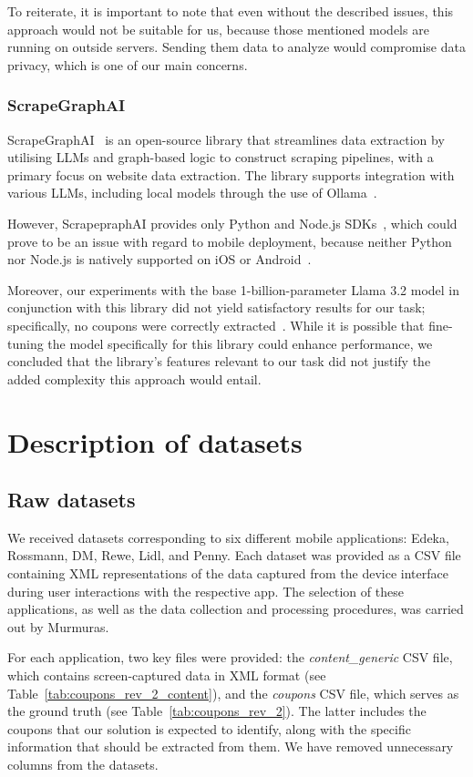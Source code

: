 \documentclass[licencjacka,en]{pracamgr}
\begin{document}
To reiterate, it is important to note that even without the described issues, this approach would not be suitable for us, because those mentioned models are running on outside servers. Sending them data to analyze would compromise data privacy, which is one of our main concerns.

\subsection{ScrapeGraphAI}
ScrapeGraphAI~\cite{scapegraph_repo} is an open-source library that streamlines data extraction by utilising LLMs and graph-based logic to construct scraping pipelines, with a primary focus on website data extraction. The library supports integration with various LLMs, including local models through the use of Ollama~\cite{ollama_repo, scapegraph_usage}.

However, ScrapepraphAI provides only Python and Node.js SDKs~\cite{scapegraph_sdks}, which could prove to be an issue with regard to mobile deployment, because neither Python nor Node.js is natively supported on iOS or Android~\cite{android_dev_site, ios_dev_site}.

Moreover, our experiments with the base 1-billion-parameter Llama 3.2 model in conjunction with this library did not yield satisfactory results for our task; specifically, no coupons were correctly extracted~\cite{scrapegraph-exp}. While it is possible that fine-tuning the model specifically for this library could enhance performance, we concluded that the library's features relevant to our task did not justify the added complexity this approach would entail.

\chapter{Description of datasets} \label{chap:datasets}
\section{Raw datasets}
We received datasets corresponding to six different mobile applications: Edeka, Rossmann, DM, Rewe, Lidl, and Penny. Each dataset was provided as a CSV file containing XML representations of the data captured from the device interface during user interactions with the respective app. The selection of these applications, as well as the data collection and processing procedures, was carried out by Murmuras.

For each application, two key files were provided: the \textit{content\_generic} CSV file, which contains screen-captured data in XML format (see Table~\ref{tab:coupons_rev_2_content}), and the \textit{coupons} CSV file, which serves as the ground truth (see Table~\ref{tab:coupons_rev_2}). The latter includes the coupons that our solution is expected to identify, along with the specific information that should be extracted from them. We have removed unnecessary columns from the datasets.
\end{document}

